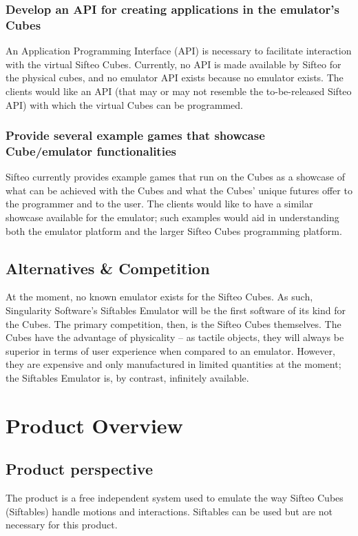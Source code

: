 \documentclass[12pt]{article}
\begin{document}
                          \subsubsection{Develop an API for creating applications in the emulator’s Cubes}
                          An Application Programming Interface (API) is necessary to facilitate interaction with the virtual Sifteo Cubes. Currently, no API is made available by Sifteo for the physical cubes, and no emulator API exists because no emulator exists. The clients would like an API (that may or may not resemble the to-be-released Sifteo API) with which the virtual Cubes can be programmed.

                          \subsubsection{Provide several example games that showcase Cube/emulator functionalities}
                          Sifteo currently provides example games that run on the Cubes as a showcase of what can be achieved with the Cubes and what the Cubes’ unique futures offer to the programmer and to the user. The clients would like to have a similar showcase available for the emulator; such examples would aid in understanding both the emulator platform and the larger Sifteo Cubes programming platform.

              \subsection{Alternatives \& Competition}
              At the moment, no known emulator exists for the Sifteo Cubes. As such, Singularity Software’s Siftables Emulator will be the first software of its kind for the Cubes. The primary competition, then, is the Sifteo Cubes themselves. The Cubes have the advantage of physicality – as tactile objects, they will always be superior in terms of user experience when compared to an emulator. However, they are expensive and only manufactured in limited quantities at the moment; the Siftables Emulator is, by contrast, infinitely available.

\section{Product Overview}

              \subsection{Product perspective}
              The product is a free independent system used to emulate the way Sifteo Cubes (Siftables) handle motions and interactions.  Siftables can be used but are not necessary for this product.
\end{document}
